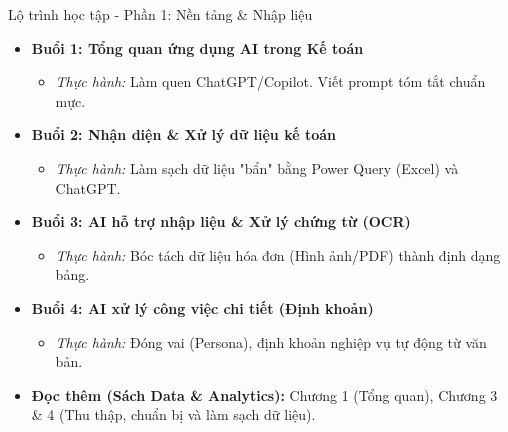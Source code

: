 \documentclass[aspectratio=169]{beamer}
\begin{document}
\begin{frame}{Lộ trình học tập - Phần 1: Nền tảng \& Nhập liệu}
    \begin{itemize}
        \item \textbf{Buổi 1: Tổng quan ứng dụng AI trong Kế toán}
        \begin{itemize}
            \item \textit{Thực hành:} Làm quen ChatGPT/Copilot. Viết prompt tóm tắt chuẩn mực.
        \end{itemize}
        \item \textbf{Buổi 2: Nhận diện \& Xử lý dữ liệu kế toán}
        \begin{itemize}
            \item \textit{Thực hành:} Làm sạch dữ liệu "bẩn" bằng Power Query (Excel) và ChatGPT.
        \end{itemize}
        \item \textbf{Buổi 3: AI hỗ trợ nhập liệu \& Xử lý chứng từ (OCR)}
        \begin{itemize}
            \item \textit{Thực hành:} Bóc tách dữ liệu hóa đơn (Hình ảnh/PDF) thành định dạng bảng.
        \end{itemize}
        \item \textbf{Buổi 4: AI xử lý công việc chi tiết (Định khoản)}
        \begin{itemize}
            \item \textit{Thực hành:} Đóng vai (Persona), định khoản nghiệp vụ tự động từ văn bản.
        \end{itemize}
        \vspace{0.3cm}
        \item \textbf{Đọc thêm (Sách Data \& Analytics):} Chương 1 (Tổng quan), Chương 3 \& 4 (Thu thập, chuẩn bị và làm sạch dữ liệu).
    \end{itemize}
\end{frame}
\end{document}
